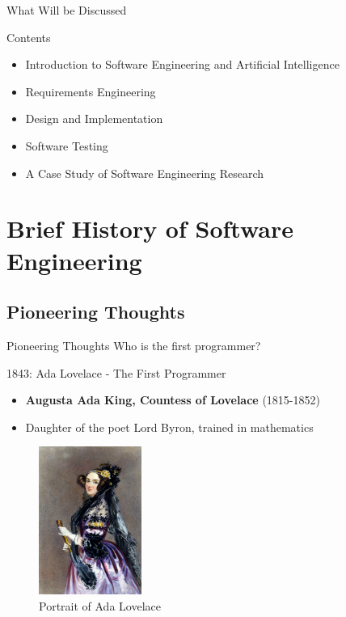 \documentclass{beamer}
\begin{document}
\begin{frame}[t]{What Will be Discussed}
    \begin{block}{Contents}
        \begin{itemize}
            \item Introduction to Software Engineering and Artificial Intelligence
            \item Requirements Engineering
            \item Design and Implementation
            \item Software Testing 
            \item A Case Study of Software Engineering Research
        \end{itemize}
    \end{block}
\end{frame}

\section{Brief History of Software Engineering}
\subsection{Pioneering Thoughts}

\begin{frame}[t]{Pioneering Thoughts}
    \vspace{7em}
    \centering
    \Huge
    Who is the first programmer?
\end{frame}

\begin{frame}[t]{1843: Ada Lovelace - The First Programmer}
        \begin{itemize}
            \item \textbf{Augusta Ada King, Countess of Lovelace} (1815-1852)
            \item Daughter of the poet Lord Byron, trained in mathematics
        \end{itemize}
        \begin{figure}[b]
            \centering
            \includegraphics[width=0.3\textwidth]{images/Ada_Lovelace_portrait.jpg}
            \caption{Portrait of Ada Lovelace}
        \end{figure}
\end{frame}
\end{document}
